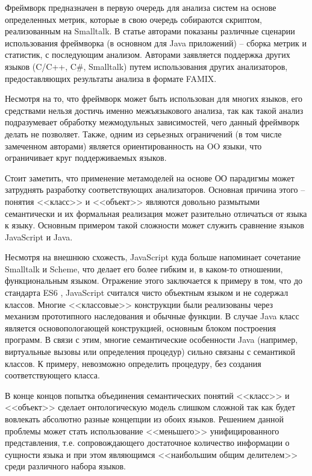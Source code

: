 Фреймворк предназначен в первую очередь для анализа систем на основе определенных метрик,
которые в свою очередь собираются скриптом, реализованным на Smalltalk. В статье авторами показаны
различные сценарии использования фреймворка (в основном для Java приложений) -- сборка метрик и статистик,
с последующим анализом. Авторами заявляется поддержка других языков (C/C++, C\#, Smalltalk) путем использования других анализаторов,
предоставляющих результаты анализа в формате FAMIX.

Несмотря на то, что фреймворк может быть использован для многих языков, его средствами нельзя достичь именно
межъязыкового анализа, так как такой анализ подразумевает обработку межмодульных зависимостей, чего
данный фреймворк делать не позволяет. Также, одним из серьезных ограничений (в том числе замеченном авторами) является
ориентированность на OO  языки, что ограничивает круг поддерживаемых языков.

Стоит заметить, что применение метамоделей на основе ОО парадигмы может затруднять
разработку соответствующих анализаторов. Основная причина этого -- понятия <<класс>> и <<объект>> являются довольно
размытыми семантически и их формальная реализация может разительно отличаться от языка к языку.
Основным примером такой сложности может служить сравнение языков JavaScript и Java. 

Несмотря на внешнюю схожесть, JavaScript куда больше напоминает сочетание Smalltalk и Scheme, что делает его более гибким
и, в каком-то отношении, функциональным языком. Отражение этого заключается к примеру в том, что до 
стандарта ES6 \cite{ecma262}, JavaScript считался чисто объектным языком и не содержал классов. Многие
<<классовые>> конструкции были реализованы через механизм прототипного наследования и обычные функции.
В случае Java класс является основопологающей конструкцией, основным блоком построения программ. В связи
с этим, многие семантические особенности Java (например, виртуальные вызовы или определения процедур) сильно
связаны с семантикой классов. К примеру, невозможно определить процедуру, без создания соответствующего класса.

В конце концов попытка объединения семантических понятий <<класс>> и <<объект>> сделает онтологическую модель
слишком сложной так как будет вовлекать абсолютно разные концепции из обоих языков. Решением данной проблемы
может стать использование <<меньшего>> унифицированного представления, т.е. сопровождающего
достаточное количество информации о сущности языка и при этом являющимся <<наибольшим общим делителем>>
среди различного набора языков.


